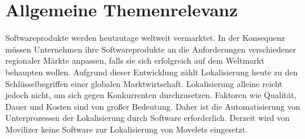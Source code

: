 \section{Allgemeine Themenrelevanz}
Softwareprodukte werden heutzutage weltweit vermarktet. In der Konsequenz müssen Unternehmen ihre Softwareprodukte an die Anforderungen verschiedener regionaler Märkte anpassen, falls sie sich erfolgreich auf dem Weltmarkt behaupten wollen. Aufgrund dieser Entwicklung zählt Lokalisierung heute zu den Schlüsselbegriffen einer globalen Marktwirtschaft. 
\autocite[Vgl.][S. 1]{Schmitz.2000}
\autocite[Vgl.][S. 1]{Reineke.2005} 
Lokalisierung alleine reicht jedoch nicht, um sich gegen Konkurrenten durchzusetzen. Faktoren wie Qualität, Dauer und Kosten sind von großer Bedeutung. Daher ist die Automatisierung von Unterprozessen der Lokalisierung  durch Software erforderlich. 
\autocite[Vgl.][S. 1]{Zydron.2009}
Derzeit wird von Movilizer keine Software zur Lokalisierung von Movelets eingesetzt. 
